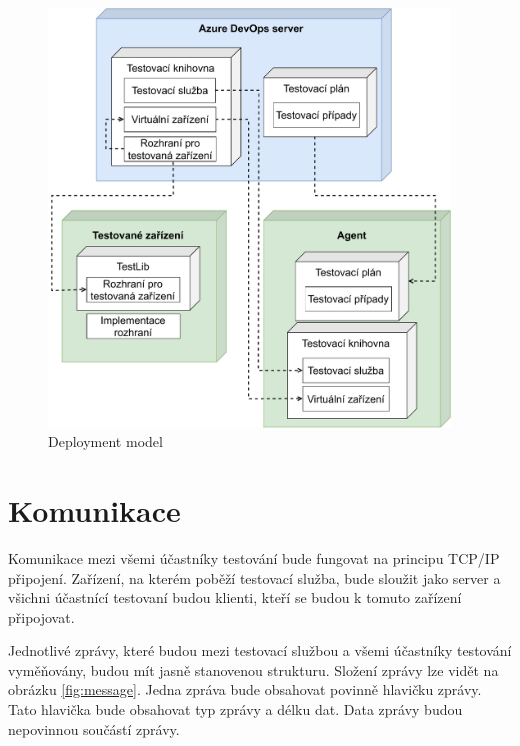 
\begin{figure}[htbp]
    \centering 
    \includegraphics[width=0.95\textwidth]{assets/img/deploymentmodel.pdf}
    \caption{Deployment model}
    \label{fig:deploymodel}
\end{figure}


\section{Komunikace}
Komunikace mezi všemi účastníky testování bude fungovat na principu TCP/IP připojení. Zařízení, na kterém poběží testovací služba, bude sloužit jako server a všichni účastnící testovaní budou klienti, kteří se budou k tomuto zařízení připojovat. 

Jednotlivé zprávy, které budou mezi testovací službou a všemi účastníky testování vyměňovány, budou mít jasně stanovenou strukturu. Složení zprávy lze vidět na obrázku \ref{fig:message}. Jedna zpráva bude obsahovat povinně hlavičku zprávy. Tato hlavička bude obsahovat typ zprávy a délku dat. Data zprávy budou nepovinnou součástí zprávy. 

